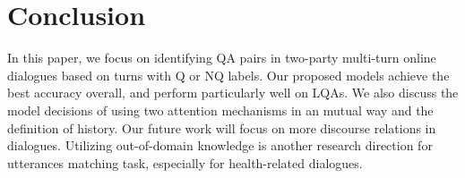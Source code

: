 \section{Conclusion}
\label{sec:conclusion}
In this paper, we focus on identifying QA pairs in two-party multi-turn online dialogues based on turns with Q or NQ labels. Our proposed models achieve the best accuracy overall, and perform particularly well on LQAs. We also discuss the model decisions of using two attention mechanisms in an mutual way and the definition of history. Our future work will focus on more discourse relations in dialogues. Utilizing out-of-domain knowledge is another research direction for utterances matching task, especially for health-related dialogues.


